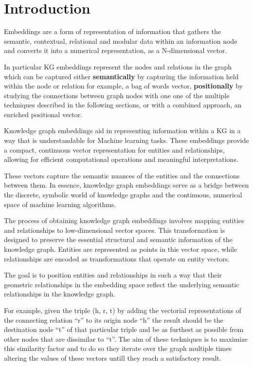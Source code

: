 \section{Introduction}\label{sec:emb-intro}
Embeddings are a form of representation of information that gathers the semantic, contextual, relational and modular data within an information node and converts it into a numerical representation, as a N-dimensional vector.

In particular KG embeddings represent the nodes and relations in the graph which can be captured either \textbf{semantically} by capturing the information held within the node or relation for example, a bag of words vector, \textbf{positionally} by studying the connections between graph nodes with one one of the multiple techniques described in the following sections, or with a combined approach, an enriched positional vector.

Knowledge graph embeddings aid in representing information within a KG in a way that is understandable for Machine learning tasks. These embeddings provide a compact, continuous vector representation for entities and relationships, allowing for efficient computational operations and meaningful interpretations.

These vectors capture the semantic nuances of the entities and the connections between them. In essence, knowledge graph embeddings serve as a bridge between the discrete, symbolic world of knowledge graphs and the continuous, numerical space of machine learning algorithms.

The process of obtaining knowledge graph embeddings involves mapping entities and relationships to low-dimensional vector spaces. This transformation is designed to preserve the essential structural and semantic information of the knowledge graph. Entities are represented as points in this vector space, while relationships are encoded as transformations that operate on entity vectors.

The goal is to position entities and relationships in such a way that their geometric relationships in the embedding space reflect the underlying semantic relationships in the knowledge graph.

For example, given the triple (h, r, t) by adding the vectorial representations of the connecting relation ``r'' to its origin node ``h'' the result should be the destination node ``t'' of that particular triple and be as furthest as possible from other nodes that are dissimilar to ``t''. The aim of these techniques is to maximize this similarity factor and to do so they iterate over the graph multiple times altering the values of these vectors untill they reach a satisfactory result.

